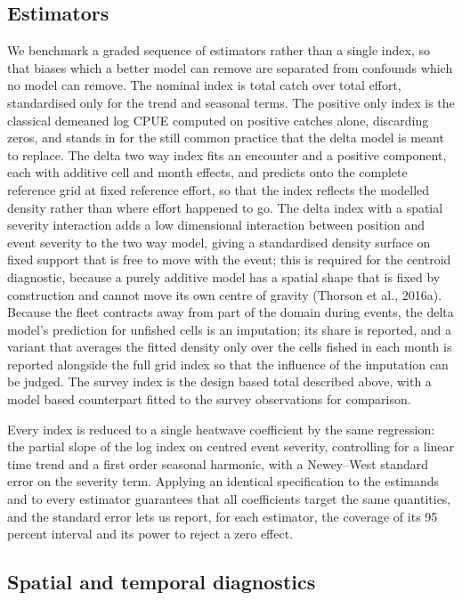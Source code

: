 \documentclass[
  11pt,
  a4paper,
]{article}
\begin{document}
\hypertarget{estimators}{%
\subsection{Estimators}\label{estimators}}

We benchmark a graded sequence of estimators rather than a single index,
so that biases which a better model can remove are separated from
confounds which no model can remove. The nominal index is total catch
over total effort, standardised only for the trend and seasonal terms.
The positive only index is the classical demeaned log CPUE computed on
positive catches alone, discarding zeros, and stands in for the still
common practice that the delta model is meant to replace. The delta two
way index fits an encounter and a positive component, each with additive
cell and month effects, and predicts onto the complete reference grid at
fixed reference effort, so that the index reflects the modelled density
rather than where effort happened to go. The delta index with a spatial
severity interaction adds a low dimensional interaction between position
and event severity to the two way model, giving a standardised density
surface on fixed support that is free to move with the event; this is
required for the centroid diagnostic, because a purely additive model
has a spatial shape that is fixed by construction and cannot move its
own centre of gravity (Thorson et al., 2016a). Because the fleet
contracts away from part of the domain during events, the delta model's
prediction for unfished cells is an imputation; its share is reported,
and a variant that averages the fitted density only over the cells
fished in each month is reported alongside the full grid index so that
the influence of the imputation can be judged. The survey index is the
design based total described above, with a model based counterpart
fitted to the survey observations for comparison.

Every index is reduced to a single heatwave coefficient by the same
regression: the partial slope of the log index on centred event
severity, controlling for a linear time trend and a first order seasonal
harmonic, with a Newey--West standard error on the severity term.
Applying an identical specification to the estimands and to every
estimator guarantees that all coefficients target the same quantities,
and the standard error lets us report, for each estimator, the coverage
of its 95 percent interval and its power to reject a zero effect.

\hypertarget{spatial-and-temporal-diagnostics}{%
\subsection{Spatial and temporal
diagnostics}\label{spatial-and-temporal-diagnostics}}
\end{document}
